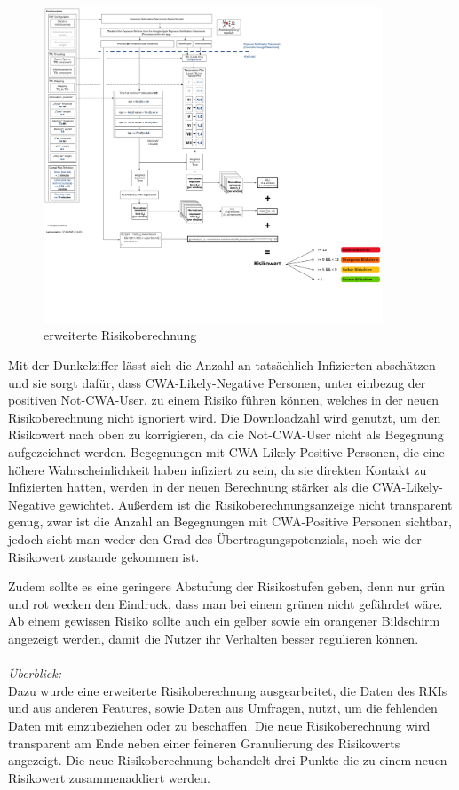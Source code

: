 \documentclass[conference]{IEEEtran}
\begin{document}
\begin{figure}[h]
	\centering
	\includegraphics[width=0.9\textwidth]{"RiskCalculation"}
	\caption{erweiterte Risikoberechnung}
	\label{ErweiterteRisikoberechnung_Abbildung}
\end{figure}

Mit der Dunkelziffer lässt sich die Anzahl an tatsächlich Infizierten abschätzen und sie sorgt dafür, dass CWA-Likely-Negative Personen, unter einbezug der positiven Not-CWA-User, 
zu einem Risiko führen können, welches in der neuen Risikoberechnung nicht ignoriert wird.
Die Downloadzahl wird genutzt, um den Risikowert nach oben zu korrigieren, da die Not-CWA-User nicht als Begegnung aufgezeichnet werden.
Begegnungen mit CWA-Likely-Positive Personen, die eine höhere Wahrscheinlichkeit haben infiziert zu sein, da sie direkten Kontakt zu Infizierten hatten, 
werden in der neuen Berechnung stärker als die CWA-Likely-Negative gewichtet.
Außerdem ist die Risikoberechnungsanzeige nicht transparent genug, zwar ist die Anzahl an Begegnungen mit CWA-Positive Personen sichtbar, 
jedoch sieht man weder den Grad des Übertragungspotenzials, noch wie der Risikowert zustande gekommen ist.

Zudem sollte es eine geringere Abstufung der Risikostufen geben, denn nur grün und rot wecken den Eindruck, dass man bei einem grünen nicht gefährdet wäre. 
Ab einem gewissen Risiko sollte auch ein gelber sowie ein orangener Bildschirm angezeigt werden, damit die Nutzer ihr Verhalten besser regulieren können. \\
\\
\textit{Überblick:} \\
Dazu wurde eine erweiterte Risikoberechnung ausgearbeitet, die Daten des RKIs und aus anderen Features, sowie Daten aus Umfragen, nutzt, 
um die fehlenden Daten mit einzubeziehen oder zu beschaffen. Die neue Risikoberechnung wird transparent am Ende neben einer feineren Granulierung des Risikowerts angezeigt. 
Die neue Risikoberechnung behandelt drei Punkte die zu einem neuen Risikowert zusammenaddiert werden.
\end{document}
